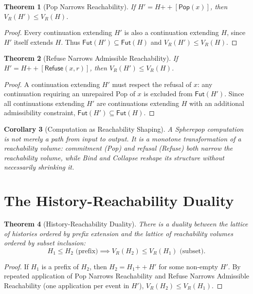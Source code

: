 \documentclass[12pt, a4paper, openany]{book}
\theoremstyle{plain}
\newtheorem{theorem}{Theorem}[chapter]
\newtheorem{corollary}[theorem]{Corollary}
\theoremstyle{definition}
\theoremstyle{remark}
\newcommand{\Pop}{\mathsf{Pop}}
\newcommand{\Refuse}{\mathsf{Refuse}}
\begin{document}
\begin{theorem}[Pop Narrows Reachability]
If $H' = H \mathbin{++} [\Pop(x)]$, then $V_R(H') \leq V_R(H)$.
\end{theorem}

\begin{proof}
Every continuation extending $H'$ is also a continuation extending $H$, since
$H'$ itself extends $H$. Thus $\mathsf{Fut}(H') \subseteq \mathsf{Fut}(H)$
and $V_R(H') \leq V_R(H)$.
\end{proof}

\begin{theorem}[Refuse Narrows Admissible Reachability]
If $H' = H \mathbin{++} [\Refuse(x,r)]$, then $V_R(H') \leq V_R(H)$.
\end{theorem}

\begin{proof}
A continuation extending $H'$ must respect the refusal of $x$: any continuation
requiring an unrepaired Pop of $x$ is excluded from $\mathsf{Fut}(H')$.
Since all continuations extending $H'$ are continuations extending $H$ with
an additional admissibility constraint, $\mathsf{Fut}(H') \subseteq \mathsf{Fut}(H)$.
\end{proof}

\begin{corollary}[Computation as Reachability Shaping]
A Spherepop computation is not merely a path from input to output. It is a
monotone transformation of a reachability volume: commitment (Pop) and refusal
(Refuse) both narrow the reachability volume, while Bind and Collapse reshape
its structure without necessarily shrinking it.
\end{corollary}

\section{The History-Reachability Duality}

\begin{theorem}[History-Reachability Duality]
There is a duality between the lattice of histories ordered by prefix extension
and the lattice of reachability volumes ordered by subset inclusion:
\[
H_1 \leq H_2 \text{ (prefix)} \implies V_R(H_2) \leq V_R(H_1) \text{ (subset)}.
\]
\end{theorem}

\begin{proof}
If $H_1$ is a prefix of $H_2$, then $H_2 = H_1 \mathbin{++} H'$ for some
non-empty $H'$. By repeated application of Pop Narrows Reachability and
Refuse Narrows Admissible Reachability (one application per event in $H'$),
$V_R(H_2) \leq V_R(H_1)$.
\end{proof}
\end{document}
